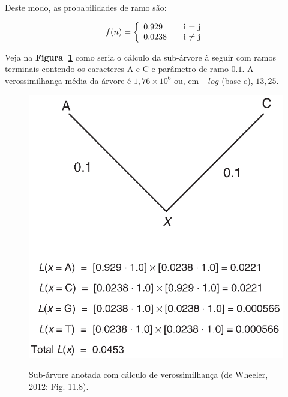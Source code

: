 \begin{refsection}
Deste modo, as probabilidades de ramo são:

\begin{center}
\begin{equation}
f(n) = \left\{
  \begin{array}{l l}
    0.929 & \quad \text{i $=$ j}\\
    0.0238 & \quad \text{i $\neq$ j}
  \end{array} \right.
\end{equation}
\end{center}

Veja na \textbf{Figura~\ref{tut12:fig:exemplo}} como seria o cálculo da sub-árvore à seguir com ramos terminais contendo os caracteres A e C e parâmetro de ramo $0.1$. A verossimilhança média da árvore é $1,76 \times 10^{6}$ ou, em $-log$ (base $e$), $13,25$.

  \begin{figure}[H]
      {\includegraphics[scale=1.0]{figures/tut12/exemplo.eps}}
	{\caption[Sub-árvore anotada com cálculo de verossimilhança]{Sub-árvore anotada com cálculo de verossimilhança (de Wheeler, 2012: Fig. 11.8).}\label{tut12:fig:exemplo}}
  \end{figure}



\end{refsection}
